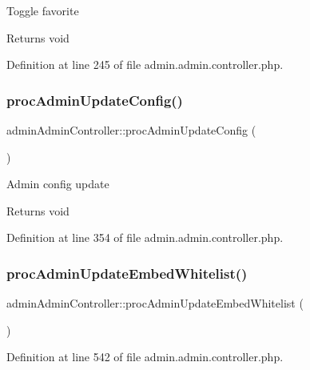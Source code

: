 Toggle favorite \begin{DoxyReturn}{Returns}
void 
\end{DoxyReturn}


Definition at line 245 of file admin.\+admin.\+controller.\+php.

\hypertarget{classadminAdminController_a720735446257b930dce48d07c4ac9e4e}{}\label{classadminAdminController_a720735446257b930dce48d07c4ac9e4e} 
\subsubsection{\texorpdfstring{proc\+Admin\+Update\+Config()}{procAdminUpdateConfig()}}
{\footnotesize\ttfamily admin\+Admin\+Controller\+::proc\+Admin\+Update\+Config (\begin{DoxyParamCaption}{ }\end{DoxyParamCaption})}

Admin config update \begin{DoxyReturn}{Returns}
void 
\end{DoxyReturn}


Definition at line 354 of file admin.\+admin.\+controller.\+php.

\hypertarget{classadminAdminController_aff36b4021e19ccb44ab87043faf13b1a}{}\label{classadminAdminController_aff36b4021e19ccb44ab87043faf13b1a} 
\subsubsection{\texorpdfstring{proc\+Admin\+Update\+Embed\+Whitelist()}{procAdminUpdateEmbedWhitelist()}}
{\footnotesize\ttfamily admin\+Admin\+Controller\+::proc\+Admin\+Update\+Embed\+Whitelist (\begin{DoxyParamCaption}{ }\end{DoxyParamCaption})}



Definition at line 542 of file admin.\+admin.\+controller.\+php.

\hypertarget{classadminAdminController_a4bbc5bf3f60f108c82b373b4b6fbf8a1}{}\label{classadminAdminController_a4bbc5bf3f60f108c82b373b4b6fbf8a1} 

